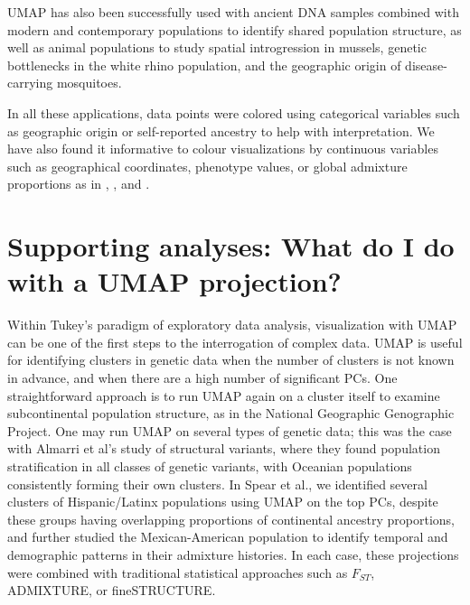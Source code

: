 \documentclass[12pt]{article}
\begin{document}
UMAP has also been successfully used with ancient DNA samples combined with modern and contemporary populations to identify shared population structure\cite{margaryan_population_2019}, as well as animal populations to study spatial introgression in mussels\cite{simon_local_2019}, genetic bottlenecks in the white rhino population\cite{sanchez-barreiro_historical_2020}, and the geographic origin of disease-carrying mosquitoes\cite{consortium_genome_2020}\cite{schmidt_population_2020}. 

In all these applications, data points were colored using categorical variables such as geographic origin or self-reported ancestry to help with interpretation. We have also found it informative to colour visualizations by continuous variables such as geographical coordinates, phenotype values, or global admixture proportions as in \cite{diaz-papkovich_umap_2019}, \cite{dai_population_2020}, and \cite{spear2020recent}.

\section*{Supporting analyses: What do I do with a UMAP projection?}
Within Tukey's paradigm of exploratory data analysis, visualization with UMAP can be one of the first steps to the interrogation of complex data\cite{holmes2018modern}. UMAP is useful for identifying clusters in genetic data when the number of clusters is not known in advance\cite{tonkin-hill_fast_2019}, and when there are a high number of significant PCs\cite{diaz-papkovich_umap_2019}. One straightforward approach is to run UMAP again on a cluster itself to examine subcontinental population structure, as in the National Geographic Genographic Project\cite{dai_population_2020}. One may run UMAP on several types of genetic data; this was the case with Almarri et al's study of structural variants, where they found population stratification in all classes of genetic variants, with Oceanian populations consistently forming their own clusters\cite{almarri_population_2020}. In Spear et al., we identified several clusters of Hispanic/Latinx populations using UMAP on the top PCs, despite these groups having overlapping proportions of continental ancestry proportions, and further studied the Mexican-American population to identify temporal and demographic patterns in their admixture histories\cite{spear2020recent}. In each case, these projections were combined with traditional statistical approaches such as $F_{ST}$, ADMIXTURE\cite{alexander2009fast}, or fineSTRUCTURE\cite{lawson2012inference}.
\end{document}
